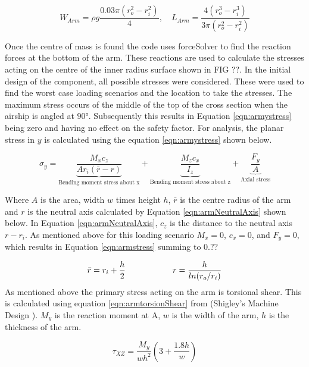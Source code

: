 \documentclass[../main.tex]{subfiles}
\begin{document}
\begin{equation} \label{eqn:armCg}
W_{Arm} = \rho g\frac{0.03\pi(r_o^2 - r_i^2)}{4}, \quad L_{Arm} =\frac{4(r_o^3 - r_i^3)}{3\pi(r_o^2 - r_i^2)}
\end{equation}

Once the centre of mass is found the code uses forceSolver to find the reaction forces at the bottom of the arm. These reactions are used to calculate the stresses acting on the centre of the inner radius surface shown in FIG ??. In the initial design of the component, all possible stresses were considered. These were used to find the worst case loading scenarios and the location to take the stresses. The maximum stress occurs of the middle of the top of the cross section when the airship is angled at $90°$. Subsequently this results in Equation \ref{eqn:armystress} being zero and having no effect on the safety factor. For analysis, the planar stress in $y$ is calculated using the equation \ref{eqn:armystress} shown below. 

\begin{equation}
\label{eqn:armstress}
\sigma_{y}=  \underbrace{\frac{M_{x}c_z}{A r_i (\bar{r} - r)}}_\text{Bending moment stress about x} + \underbrace{\frac{M_{z}c_x}{I_z}}_\text{Bending moment stress about z} + \underbrace{\frac{F_y}{A}}_\text{Axial stress} 
\end{equation}

Where $A$ is the area, width $w$ times height $h$, $\bar{r}$ is the centre radius of the arm and $r$ is the neutral axis calculated by Equation \ref{eqn:armNeutralAxis} shown below. In Equation \ref{eqn:armNeutralAxis}, $c_z$ is the distance to the neutral axis $r - r_i$. As mentioned above for this loading scenario $M_x = 0$, $c_x = 0$, and $F_y = 0$, which results in Equation \ref{eqn:armstress} summing to 0.??

\begin{equation} \label{eqn:armNeutralAxis}
\bar{r} = r_i + \frac{h}{2} \hspace{20mm}  r = \frac{h}{ln(r_o/r_i)}
\end{equation}
As mentioned above the primary stress acting on the arm is torsional shear. This is calculated using equation \ref{eqn:armtorsionShear} from {(Shigley's Machine Design \cite[102]{shigley})}. $M_y$ is the reaction moment at A, $w$ is the width of the arm, $h$ is the thickness of the arm.

\begin{equation} \label{eqn:armtorsionShear}
\tau_{XZ} = \dfrac{M_{y}}{wh^2}(3+\frac{1.8h}{w})
\end{equation}
\end{document}

